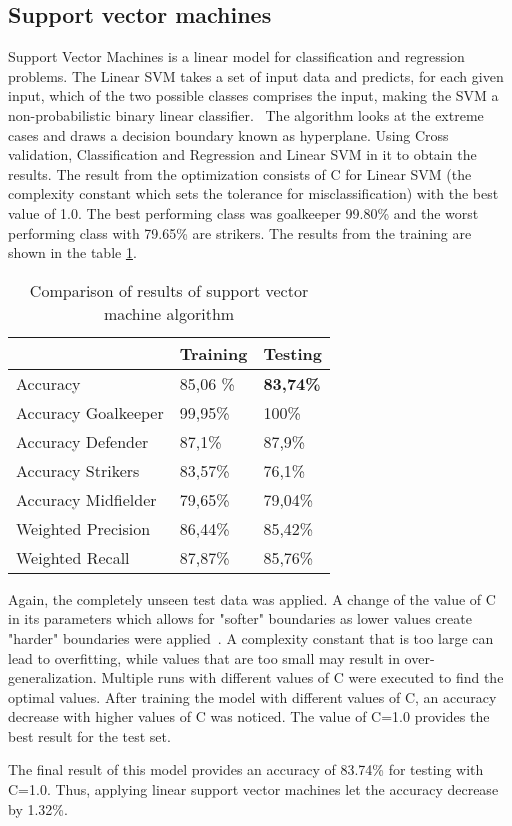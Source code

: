 \subsection{Support vector machines}
Support Vector Machines is a linear model for classification and regression problems. The Linear SVM takes a set of input data and predicts, for each given input, which of the two possible classes comprises the input, making the SVM a non-probabilistic binary linear classifier.~\cite{ref_rapidminersvm} \newline The algorithm looks at the extreme cases and draws a decision boundary known as hyperplane. Using Cross validation, Classification and Regression and Linear SVM in it to obtain the results. The result from the optimization consists of C for Linear SVM (the complexity constant which sets the tolerance for misclassification) with the best value of 1.0. The best performing class was goalkeeper 99.80\% and the worst performing class with 79.65\% are strikers. The results from the training are shown in the table \ref{Tab:SVM}.

\begin{table}[]
\centering
\begin{tabular}{@{}l|ll@{}}
\toprule
                    & Training & Testing \\ \midrule
Accuracy            & 85,06 \% & \textbf{83,74\%} \\ \midrule
Accuracy Goalkeeper & 99,95\%  & 100\%   \\
Accuracy Defender   & 87,1\%   & 87,9\%  \\
Accuracy Strikers   & 83,57\%  & 76,1\%  \\
Accuracy Midfielder & 79,65\%  & 79,04\% \\ \midrule
Weighted Precision  & 86,44\%  & 85,42\% \\
Weighted Recall     & 87,87\%  & 85,76\% \\ \bottomrule
\end{tabular}
\label{Tab:SVM}
\caption{Comparison of results of support vector machine algorithm}
\end{table}
Again, the completely unseen test data was applied. A change of the value of C in its parameters which allows for "softer" boundaries as lower values create "harder" boundaries were applied~\cite{ref_rapidminersvm2}. A complexity constant that is too large can lead to overfitting, while values that are too small may result in over-generalization. Multiple runs with different values of C were executed to find the optimal values. After training the model  with different values of C, an accuracy decrease with higher values of C was noticed. The value of C=1.0 provides the best result for the test set. 

The final result of this model provides an accuracy of 83.74\% for testing with C=1.0. Thus, applying linear support vector machines let the accuracy decrease by 1.32\%.

